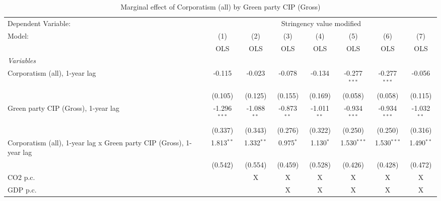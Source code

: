 
\begin{table}[htbp]
   \caption{Marginal effect of Corporatism (all) by Green party CIP (Gross)}
   \centering
   \begin{tabular}{lccccccc}
      \toprule
      Dependent Variable: & \multicolumn{7}{c}{Stringency value modified}\\
      Model:                                                              & (1)            & (2)           & (3)           & (4)           & (5)            & (6)            & (7)\\  
                                                                          &  OLS           & OLS           & OLS           & OLS           & OLS            & OLS            & OLS\\  
      \midrule
      \emph{Variables}\\
      Corporatism (all), 1-year lag                                       & -0.115         & -0.023        & -0.078        & -0.134        & -0.277$^{***}$ & -0.277$^{***}$ & -0.056\\   
                                                                          & (0.105)        & (0.125)       & (0.155)       & (0.169)       & (0.058)        & (0.058)        & (0.115)\\   
      Green party CIP (Gross), 1-year lag                                 & -1.296$^{***}$ & -1.088$^{**}$ & -0.873$^{**}$ & -1.011$^{**}$ & -0.934$^{***}$ & -0.934$^{***}$ & -1.032$^{**}$\\   
                                                                          & (0.337)        & (0.343)       & (0.276)       & (0.322)       & (0.250)        & (0.250)        & (0.316)\\   
      Corporatism (all), 1-year lag x Green party CIP (Gross), 1-year lag & 1.813$^{**}$   & 1.332$^{**}$  & 0.975$^{*}$   & 1.130$^{*}$   & 1.530$^{***}$  & 1.530$^{***}$  & 1.490$^{**}$\\   
                                                                          & (0.542)        & (0.554)       & (0.459)       & (0.528)       & (0.426)        & (0.428)        & (0.472)\\   
      CO2 p.c.                                                            &                & X             & X             & X             & X              & X              & X\\  
      GDP p.c.                                                            &                &               & X             & X             & X              & X              & X\\  

\end{tabular}
\end{table}
